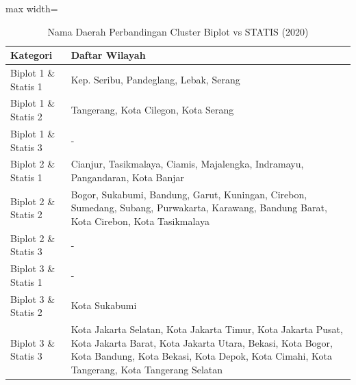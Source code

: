 \begin{table}[H]
\centering
\caption{Nama Daerah Perbandingan Cluster Biplot vs STATIS (2020)} \label{tab:appbiplot_statis_comp_name_2020}
\begin{adjustbox}{max width=\textwidth}
\begin{tabular}{|p{4cm}|p{10cm}|}
\hline
\textbf{Kategori} & \textbf{Daftar Wilayah} \\
\hline
Biplot 1 \& Statis 1 & Kep. Seribu, Pandeglang, Lebak, Serang \\
\hline
Biplot 1 \& Statis 2 & Tangerang, Kota Cilegon, Kota Serang \\
\hline
Biplot 1 \& Statis 3 & - \\
\hline
Biplot 2 \& Statis 1 & Cianjur, Tasikmalaya, Ciamis, Majalengka, Indramayu, Pangandaran, Kota Banjar \\
\hline
Biplot 2 \& Statis 2 & Bogor, Sukabumi, Bandung, Garut, Kuningan, Cirebon, Sumedang, Subang, Purwakarta, Karawang, Bandung Barat, Kota Cirebon, Kota Tasikmalaya \\
\hline
Biplot 2 \& Statis 3 & - \\
\hline
Biplot 3 \& Statis 1 & - \\
\hline
Biplot 3 \& Statis 2 & Kota Sukabumi \\
\hline
Biplot 3 \& Statis 3 & Kota Jakarta Selatan, Kota Jakarta Timur, Kota Jakarta Pusat, Kota Jakarta Barat, Kota Jakarta Utara, Bekasi, Kota Bogor, Kota Bandung, Kota Bekasi, Kota Depok, Kota Cimahi, Kota Tangerang, Kota Tangerang Selatan \\
\hline
\end{tabular}
\end{adjustbox}
\end{table}
